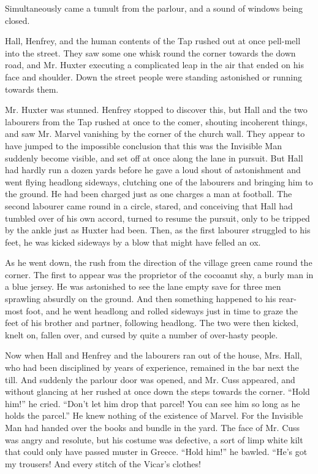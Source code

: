 Simultaneously came a tumult from the parlour, and a sound of windows being closed.

Hall, Henfrey, and the human contents of the Tap rushed out at once pell-mell into the street. They saw some one whisk round the corner towards the down road, and Mr. Huxter executing a complicated leap in the air that ended on his face and shoulder. Down the street people were standing astonished or running towards them.

Mr. Huxter was stunned. Henfrey stopped to discover this, but Hall and the two labourers from the Tap rushed at once to the comer, shouting incoherent things, and saw Mr. Marvel vanishing by the corner of the church wall. They appear to have jumped to the impossible conclusion that this was the Invisible Man suddenly become visible, and set off at once along the lane in pursuit. But Hall had hardly run a dozen yards before he gave a loud shout of astonishment and went flying headlong sideways, clutching one of the labourers and bringing him to the ground. He had been charged just as one charges a man at football. The second labourer came round in a circle, stared, and conceiving that Hall had tumbled over of his own accord, turned to resume the pursuit, only to be tripped by the ankle just as Huxter had been. Then, as the first labourer struggled to his feet, he was kicked sideways by a blow that might have felled an ox.

As he went down, the rush from the direction of the village green came round the corner. The first to appear was the proprietor of the cocoanut shy, a burly man in a blue jersey. He was astonished to see the lane empty save for three men sprawling absurdly on the ground. And then something happened to his rear-most foot, and he went headlong and rolled sideways just in time to graze the feet of his brother and partner, following headlong. The two were then kicked, knelt on, fallen over, and cursed by quite a number of over-hasty people.

Now when Hall and Henfrey and the labourers ran out of the house, Mrs. Hall, who had been disciplined by years of experience, remained in the bar next the till. And suddenly the parlour door was opened, and Mr. Cuss appeared, and without glancing at her rushed at once down the steps towards the corner. “Hold him!” he cried. “Don’t let him drop that parcel! You can see him so long as he holds the parcel.” He knew nothing of the existence of Marvel. For the Invisible Man had handed over the books and bundle in the yard. The face of Mr. Cuss was angry and resolute, but his costume was defective, a sort of limp white kilt that could only have passed muster in Greece. “Hold him!” he bawled. “He’s got my trousers! And every stitch of the Vicar’s clothes!

